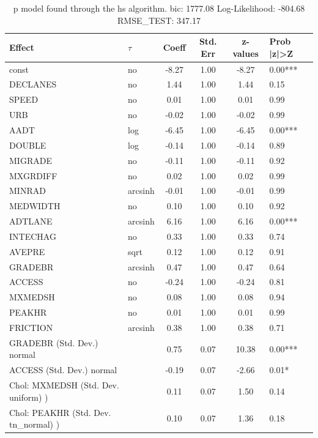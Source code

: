 \begin{table}
	\caption{p model found through the hs algorithm. bic: 1777.08 Log-Likelihood: -804.68 RMSE_TEST: 347.17}
	\begin{center}
		\begin{tabular}{|l|l|c|c|c|l|}
			\hline
			Effect & $\tau$ & Coeff & Std. Err & z-values & Prob |z|>Z \\
			\hline
			const & no & -8.27 & 1.00 & -8.27 & 0.00*** \\
			\hline
			DECLANES & no & 1.44 & 1.00 & 1.44 & 0.15 \\
			\hline
			SPEED & no & 0.01 & 1.00 & 0.01 & 0.99 \\
			\hline
			URB & no & -0.02 & 1.00 & -0.02 & 0.99 \\
			\hline
			AADT & log & -6.45 & 1.00 & -6.45 & 0.00*** \\
			\hline
			DOUBLE & log & -0.14 & 1.00 & -0.14 & 0.89 \\
			\hline
			MIGRADE & no & -0.11 & 1.00 & -0.11 & 0.92 \\
			\hline
			MXGRDIFF & no & 0.02 & 1.00 & 0.02 & 0.99 \\
			\hline
			MINRAD & arcsinh & -0.01 & 1.00 & -0.01 & 0.99 \\
			\hline
			MEDWIDTH & no & 0.10 & 1.00 & 0.10 & 0.92 \\
			\hline
			ADTLANE & arcsinh & 6.16 & 1.00 & 6.16 & 0.00*** \\
			\hline
			INTECHAG & no & 0.33 & 1.00 & 0.33 & 0.74 \\
			\hline
			AVEPRE & sqrt & 0.12 & 1.00 & 0.12 & 0.91 \\
			\hline
			GRADEBR & arcsinh & 0.47 & 1.00 & 0.47 & 0.64 \\
			\hline
			ACCESS & no & -0.24 & 1.00 & -0.24 & 0.81 \\
			\hline
			MXMEDSH & no & 0.08 & 1.00 & 0.08 & 0.94 \\
			\hline
			PEAKHR & no & 0.01 & 1.00 & 0.01 & 0.99 \\
			\hline
			FRICTION & arcsinh & 0.38 & 1.00 & 0.38 & 0.71 \\
			\hline
			GRADEBR (Std. Dev.) normal &  & 0.75 & 0.07 & 10.38 & 0.00*** \\
			\hline
			ACCESS (Std. Dev.) normal &  & -0.19 & 0.07 & -2.66 & 0.01* \\
			\hline
			 Chol: MXMEDSH (Std. Dev. uniform) ) &  & 0.11 & 0.07 & 1.50 & 0.14 \\
			\hline
			 Chol: PEAKHR (Std. Dev. tn_normal) ) &  & 0.10 & 0.07 & 1.36 & 0.18 \\

\end{tabular}
\end{center}
\end{table}
